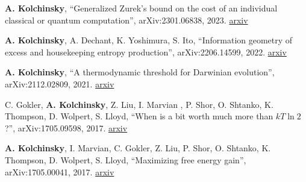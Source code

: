 
\textbf{A. Kolchinsky}, ``Generalized Zurek's bound on the cost of an individual classical or quantum computation'', arXiv:2301.06838, 2023. \href{http://arxiv.org/abs/2301.06838}{arxiv}

\textbf{A. Kolchinsky}, A. Dechant, K. Yoshimura, S. Ito, 
``Information geometry of excess and housekeeping entropy production'', arXiv:2206.14599, 2022. \href{https://arxiv.org/abs/2206.14599}{arxiv}

\textbf{A. Kolchinsky}, ``A thermodynamic threshold for Darwinian evolution'', arXiv:2112.02809, 2021. \href{http://arxiv.org/abs/2112.02809}{arxiv} 

C. Gokler, \textbf{A. Kolchinsky}, Z. Liu, I. Marvian , P. Shor, O. Shtanko, K. Thompson, D. Wolpert, S. Lloyd, ``When is a bit worth much more than $kT \ln 2$?'', arXiv:1705.09598, 2017. \href{https://arxiv.org/abs/1705.09598}{arxiv}

\textbf{A. Kolchinsky}, I. Marvian, C. Gokler, Z. Liu, P. Shor, O. Shtanko, K. Thompson, D. Wolpert, S. Lloyd, ``Maximizing free energy gain'', arXiv:1705.00041, 2017. \href{https://arxiv.org/abs/1705.00041}{arxiv}


